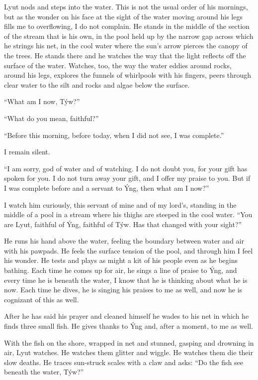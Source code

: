 Lyut nods and steps into the water. This is not the usual order of his mornings, but as the wonder on his face at the sight of the water moving around his legs fills me to overflowing, I do not complain. He stands in the middle of the section of the stream that is his own, in the pool held up by the narrow gap across which he strings his net, in the cool water where the sun's arrow pierces the canopy of the trees. He stands there and he watches the way that the light reflects off the surface of the water. Watches, too, the way the water eddies around rocks, around his legs, explores the funnels of whirlpools with his fingers, peers through clear water to the silt and rocks and algae below the surface.

``What am I now, Týw?''

``What do you mean, faithful?''

``Before this morning, before today, when I did not see, I was complete.''

I remain silent.

``I am sorry, god of water and of watching. I do not doubt you, for your gift has spoken for you. I do not turn away your gift, and I offer my praise to you. But if I was complete before and a servant to Ýng, then what am I now?''

I watch him curiously, this servant of mine and of my lord's, standing in the middle of a pool in a stream where his thighs are steeped in the cool water. ``You are Lyut, faithful of Ýng, faithful of Týw. Has that changed with your sight?''

He runs his hand above the water, feeling the boundary between water and air with his pawpads. He feels the surface tension of the pool, and through him I feel his wonder. He tests and plays as might a kit of his people even as he begins bathing. Each time he comes up for air, he sings a line of praise to Ýng, and every time he is beneath the water, I know that he is thinking about what he is now. Each time he dives, he is singing his praises to me as well, and now he is cognizant of this as well.

After he has said his prayer and cleaned himself he wades to his net in which he finds three small fish. He gives thanks to Ýng and, after a moment, to me as well.

With the fish on the shore, wrapped in net and stunned, gasping and drowning in air, Lyut watches. He watches them glitter and wiggle. He watches them die their slow deaths. He traces sun-struck scales with a claw and asks: ``Do the fish see beneath the water, Týw?''

